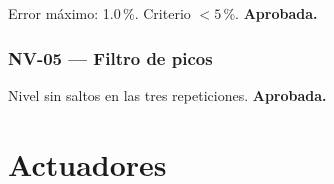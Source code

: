 \noindent Error máximo: 1.0\,\%. Criterio $< 5$\,\%. \textbf{Aprobada.}

\subsubsection*{NV-05 --- Filtro de picos}

\begin{table}[H]
\centering
\caption{Efectividad del filtro de picos del sensor de nivel.}
\label{tab:nv05}
\renewcommand{\arraystretch}{1.3}\small
{}
\end{table}

\noindent Nivel sin saltos en las tres repeticiones. \textbf{Aprobada.}

\section{Actuadores}

